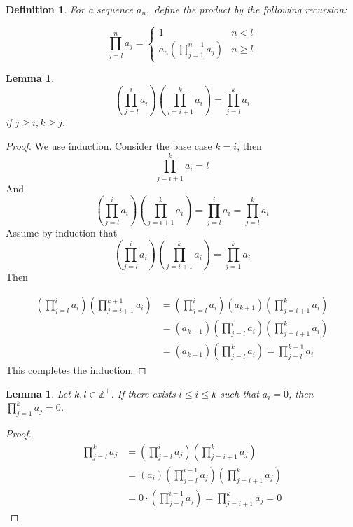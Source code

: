 \documentclass{article}
\newcommand{\Z}{\mathbb{Z}}
\newcommand{\st}{such that }
\newtheorem{defn}[thm]{Definition}
\newtheorem{lem}[thm]{Lemma}
\begin{document}
\begin{defn}
\label{prod}For a sequence $a_{n},$ define the product by the following recursion:

\begin{equation}
    \prod_{j=l}^{n} a_{j} =
    \begin{cases}
    1 & n<l\\
    a_{n}(\prod_{j=1}^{n-1} a_{j}) & n \geq l
    \end{cases}
\end{equation}
\end{defn}

\begin{lem}
\label{prod1}
$$(\prod_{j=l}^i a_i)(\prod_{j=i+1}^k a_i)=\prod_{j=l}^k a_i$$ if $j \geq i, k \geq j$.
\end{lem}
\begin{proof}
We use induction. Consider the base case $k=i$, then $$\prod_{j=i+1}^k a_i=l$$ And $$(\prod_{j=l}^i a_i)(\prod_{j=i+1}^k a_i)=\prod_{j=l}^i a_i=\prod_{j=l}^k a_i$$ Assume by induction that $$(\prod_{j=l}^i a_i)(\prod_{j=i+1}^k a_i)=\prod_{j=1}^k a_i$$
Then

\begin{equation*} 
\begin{split}
(\prod_{j=l}^i a_i)(\prod_{j=i+1}^{k+1} a_i)&=(\prod_{j=l}^i a_i)(a_{k+1})(\prod_{j=i+1}^{k} a_i)\\ &=(a_{k+1})(\prod_{j=l}^i a_i)(\prod_{j=i+1}^{k} a_i)\\
&=(a_{k+1})(\prod_{j=l}^k a_i)=\prod_{j=l}^{k+1} a_i
\end{split}
\end{equation*}
This completes the induction.
\end{proof}

\begin{lem}
\label{prod2}
Let $k, l \in \Z^+$. If there exists $l \leq i \leq k$ \st $a_i = 0$, then $\prod_{j=1}^k a_j = 0$.
\end{lem}
\begin{proof}
\begin{equation*} 
\begin{split}
\prod_{j=l}^k a_j &=(\prod_{j=l}^i a_j)(\prod_{j=i+1}^{k} a_j)\\ &=(a_{i})(\prod_{j=l}^{i-1} a_j)(\prod_{j=i+1}^{k} a_j)\\
&=0 \cdot (\prod_{j=l}^{i-1} a_j)=\prod_{j=i+1}^{k} a_j = 0
\end{split}
\end{equation*}
\end{proof}
\end{document}
